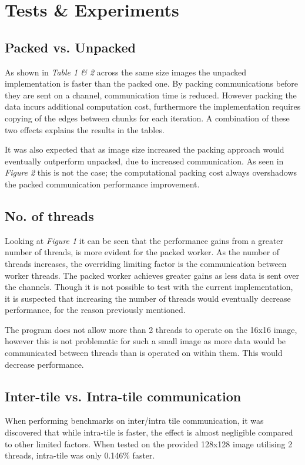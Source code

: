 \documentclass[11pt, oneside]{article}
\begin{document}
\pagebreak
\section{Tests \& Experiments}
\subsection{Packed vs. Unpacked}
As shown in \emph{Table 1 \& 2} across the same size images the unpacked implementation is faster than the packed one. By packing communications before they are sent on a channel, communication time is reduced. However packing the data incurs additional computation cost, furthermore the implementation requires copying of the edges between chunks for each iteration. A combination of these two effects explains the results in the tables. 

It was also expected that as image size increased the packing approach would eventually outperform unpacked, due to increased communication. As seen in \emph{Figure 2} this is not the case; the computational packing cost always overshadows the packed communication performance improvement.

\vspace{-4mm}
\subsection{No. of threads}
\vspace{-3mm}
Looking at \emph{Figure 1} it can be seen that the performance gains from a greater number of threads, is more evident for the packed worker. As the number of threads increases, the overriding limiting factor is the communication between worker threads. The packed worker achieves greater gains as less data is sent over the channels. Though it is not possible to test with the current implementation, it is suspected that increasing the number of threads would eventually decrease performance, for the reason previously mentioned.

The program does not allow more than 2 threads to operate on the 16x16 image, however this is not problematic for such a small image as more data would be communicated between threads than is operated on within them. This would decrease performance.

\vspace{-4mm}
\subsection{Inter-tile vs. Intra-tile communication}
\vspace{-3mm}
When performing benchmarks on inter/intra tile communication, it was discovered that while intra-tile is faster, the effect is almost negligible compared to other limited factors. When tested on the provided 128x128 image utilising 2 threads, intra-tile was only 0.146\% faster.
\end{document}
